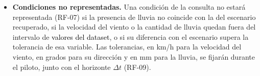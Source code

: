 \begin{itemize}
\begin{enumerate}
    \item Para cada punto seleccionado se recupera el escenario cuyas condiciones meteorológicas sean más semejantes a las de la consulta (RF-06). Para compararlas, las diferencias en la velocidad del viento, en su dirección y en la cantidad de lluvia se dividen entre la tolerancia de cada variable, definida en el siguiente requerimiento, para que las tres se comparen en la misma escala. La dirección se trata como una variable circular, cuya diferencia es el menor ángulo entre las dos direcciones; así, $355^{\circ}$ y $5^{\circ}$ difieren en $10^{\circ}$ y no en $350^{\circ}$.
  \end{enumerate}
  \item \textbf{Condiciones no representadas.} Una condición de la consulta no estará representada (RF-07) si la presencia de lluvia no coincide con la del escenario recuperado, si la velocidad del viento o la cantidad de lluvia quedan fuera del intervalo de \textcolor{black}{valores del dataset}, o si su diferencia con el escenario supera la tolerancia de esa variable. Las tolerancias, en km/h para la velocidad del viento, en grados para su dirección y en mm para la lluvia, se fijarán durante el piloto, junto con el horizonte $\Delta t$ (RF-09).
\end{itemize}